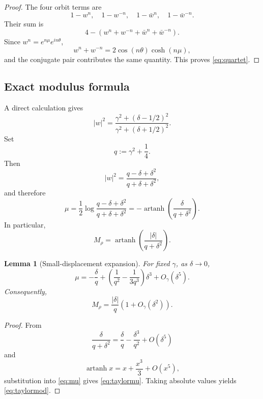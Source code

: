 \documentclass[11pt]{article}
\newtheorem{lemma}[theorem]{Lemma}
\begin{document}
\begin{proof}
The four orbit terms are
\[
1-w^n,\quad 1-w^{-n},\quad 1-\bar w^n,\quad 1-\bar w^{-n}.
\]
Their sum is
\[
4-\left(w^n+w^{-n}+\bar w^n+\bar w^{-n}\right).
\]
Since \(w^n=e^{n\mu}e^{in\theta}\),
\[
w^n+w^{-n}=2\cos(n\theta)\cosh(n\mu),
\]
and the conjugate pair contributes the same quantity. This proves \eqref{eq:quartet}.
\end{proof}

\subsection{Exact modulus formula}

A direct calculation gives
\begin{equation}
|w|^2
=
\frac{\gamma^2+(\delta-1/2)^2}
{\gamma^2+(\delta+1/2)^2}.
\label{eq:wmod}
\end{equation}
Set
\[
q:=\gamma^2+\frac14.
\]
Then
\begin{equation}
|w|^2
=
\frac{q-\delta+\delta^2}{q+\delta+\delta^2},
\label{eq:wmodq}
\end{equation}
and therefore
\begin{equation}
\mu
=
\frac12\log\frac{q-\delta+\delta^2}{q+\delta+\delta^2}
=
-\operatorname{artanh}\!\left(\frac{\delta}{q+\delta^2}\right).
\label{eq:mu}
\end{equation}
In particular,
\begin{equation}
M_\rho
=\operatorname{artanh}\!\left(\frac{|\delta|}{q+\delta^2}\right).
\label{eq:modulus}
\end{equation}

\begin{lemma}[Small-displacement expansion]
For fixed \(\gamma\), as \(\delta\to0\),
\begin{equation}
\mu
=
-\frac{\delta}{q}
+
\left(\frac1{q^2}-\frac1{3q^3}\right)\delta^3
+O_\gamma(\delta^5).
\label{eq:taylormu}
\end{equation}
Consequently,
\begin{equation}
M_\rho
=
\frac{|\delta|}{q}\left(1+O_\gamma(\delta^2)\right).
\label{eq:taylormod}
\end{equation}
\end{lemma}

\begin{proof}
From
\[
\frac{\delta}{q+\delta^2}
=
\frac{\delta}{q}-\frac{\delta^3}{q^2}+O(\delta^5)
\]
and
\[
\operatorname{artanh}x=x+\frac{x^3}{3}+O(x^5),
\]
substitution into \eqref{eq:mu} gives \eqref{eq:taylormu}. Taking absolute values yields \eqref{eq:taylormod}.
\end{proof}
\end{document}
